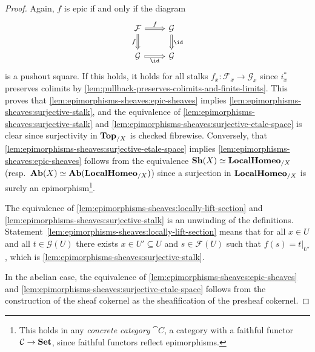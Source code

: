 \begin{proof}
Again, \(f\) is epic if and only if the diagram
\begin{equation*}
  \begin{tikzcd}[arrows=Rightarrow]
    \mathcal F \ar[r, "f"] \ar[d, "f"'] & \mathcal G \ar[d, "\id"] \\
    \mathcal G \ar[r, "\id"'] & \mathcal G
  \end{tikzcd}
\end{equation*}
is a pushout square.
If this holds, it holds for all stalks \(f_x\colon\mathcal F_x\to\mathcal G_x\) since \(i_x^*\) preserves colimits by \cref{lem:pullback-preserves-colimits-and-finite-limits}.
This proves that \cref{lem:epimorphisms-sheaves:epic-sheaves} implies \cref{lem:epimorphisms-sheaves:surjective-stalk}, and the equivalence of \cref{lem:epimorphisms-sheaves:surjective-stalk} and \cref{lem:epimorphisms-sheaves:surjective-etale-space} is clear since surjectivity in \(\mathbf{Top}_{/X}\) is checked fibrewise.
Conversely, that \cref{lem:epimorphisms-sheaves:surjective-etale-space} implies \cref{lem:epimorphisms-sheaves:epic-sheaves} follows from the equivalence \(\operatorname{\mathbf{Sh}}(X)\simeq\mathbf{LocalHomeo}_{/X}\) (resp.~\(\operatorname{\mathbf{Ab}}(X)\simeq\mathbf{Ab}(\mathbf{LocalHomeo}_{/X})\)) since a surjection in \(\mathbf{LocalHomeo}_{/X}\) is surely an epimorphism\footnote{This holds in any \emph{concrete category} \(\cat C\), a category with a faithful functor \(\mathcal{C}\to\mathbf{Set}\), since faithful functors reflect epimorphisms.}.

The equivalence of \cref{lem:epimorphisms-sheaves:locally-lift-section} and \cref{lem:epimorphisms-sheaves:surjective-stalk} is an unwinding of the definitions.
Statement~\cref{lem:epimorphisms-sheaves:locally-lift-section} means that for all \(x\in U\) and all \(t\in\mathcal G(U)\) there exists \(x\in U'\subseteq U\) and \(s\in\mathcal F(U)\) such that \(f(s) = t|_{U'}\), which is \cref{lem:epimorphisms-sheaves:surjective-stalk}.

In the abelian case, the equivalence of \cref{lem:epimorphisms-sheaves:epic-sheaves} and \cref{lem:epimorphisms-sheaves:surjective-etale-space} follows from the construction of the sheaf cokernel as the sheafification of the presheaf cokernel.
\end{proof}

